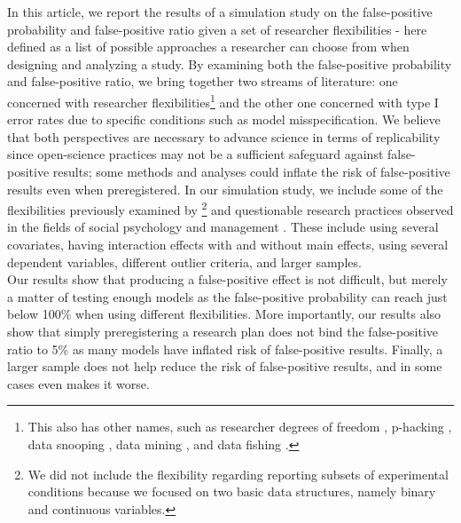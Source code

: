 In this article, we report the results of a simulation study on the false-positive probability and false-positive ratio given a set of researcher flexibilities - here defined as a list of possible approaches a researcher can choose from when designing and analyzing a study. By examining both the false-positive probability and false-positive ratio, we bring together two streams of literature: one concerned with researcher flexibilities\footnote{This also has other names, such as researcher degrees of freedom \citep{Simmons2011}, p-hacking \citep{simonsohn2014p}, data snooping \citep{white2000reality}, data mining \citep{lovell1983}, and data fishing \citep{selvin1966data}.} and the other one concerned with type I error rates due to specific conditions such as model misspecification. We believe that both perspectives are necessary to advance science in terms of replicability since open-science practices may not be a sufficient safeguard against false-positive results; some methods and analyses could inflate the risk of false-positive results even when preregistered. In our simulation study, we include some of the flexibilities previously examined by \cite{Simmons2011}\footnote{We did not include the flexibility regarding reporting subsets of experimental conditions because we focused on two basic data structures, namely binary and continuous variables.} and questionable research practices observed in the fields of social psychology \citep{Cairo2020} and management \citep{OBoyle2017}. These include using several covariates, having interaction effects with and without main effects, using several dependent variables, different outlier criteria, and larger samples. \\ 
Our results show that producing a false-positive effect is not difficult, but merely a matter of testing enough models as the false-positive probability can reach just below 100\% when using different flexibilities. More importantly, our results also show that simply preregistering a research plan does not bind the false-positive ratio to 5\% as many models have inflated risk of false-positive results. Finally, a larger sample does not help reduce the risk of false-positive results, and in some cases even makes it worse. 
